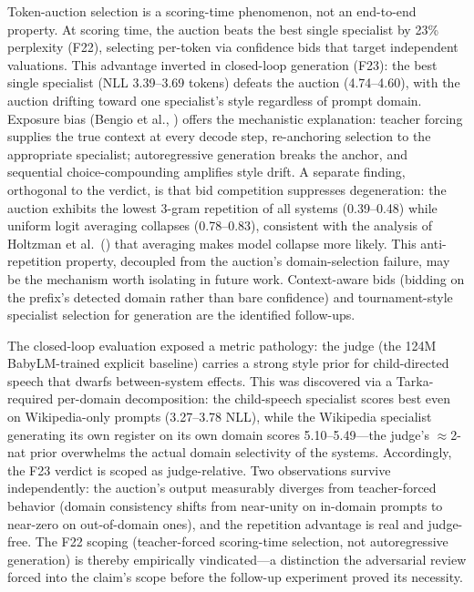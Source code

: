 Token-auction selection is a scoring-time phenomenon, not an end-to-end property. At scoring time, the auction beats the best single specialist by 23\% perplexity (F22), selecting per-token via confidence bids that target independent valuations. This advantage inverted in closed-loop generation (F23): the best single specialist (NLL 3.39--3.69 tokens) defeats the auction (4.74--4.60), with the auction drifting toward one specialist's style regardless of prompt domain. Exposure bias (Bengio et al., \cite{Bengio2015}) offers the mechanistic explanation: teacher forcing supplies the true context at every decode step, re-anchoring selection to the appropriate specialist; autoregressive generation breaks the anchor, and sequential choice-compounding amplifies style drift. A separate finding, orthogonal to the verdict, is that bid competition suppresses degeneration: the auction exhibits the lowest 3-gram repetition of all systems (0.39--0.48) while uniform logit averaging collapses (0.78--0.83), consistent with the analysis of Holtzman et al.\ (\cite{Holtzman2020}) that averaging makes model collapse more likely. This anti-repetition property, decoupled from the auction's domain-selection failure, may be the mechanism worth isolating in future work. Context-aware bids (bidding on the prefix's detected domain rather than bare confidence) and tournament-style specialist selection for generation are the identified follow-ups.

The closed-loop evaluation exposed a metric pathology: the judge (the 124M BabyLM-trained explicit baseline) carries a strong style prior for child-directed speech that dwarfs between-system effects. This was discovered via a Tarka-required per-domain decomposition: the child-speech specialist scores best even on Wikipedia-only prompts (3.27--3.78 NLL), while the Wikipedia specialist generating its own register on its own domain scores 5.10--5.49---the judge's $\approx$2-nat prior overwhelms the actual domain selectivity of the systems. Accordingly, the F23 verdict is scoped as judge-relative. Two observations survive independently: the auction's output measurably diverges from teacher-forced behavior (domain consistency shifts from near-unity on in-domain prompts to near-zero on out-of-domain ones), and the repetition advantage is real and judge-free. The F22 scoping (teacher-forced scoring-time selection, not autoregressive generation) is thereby empirically vindicated---a distinction the adversarial review forced into the claim's scope before the follow-up experiment proved its necessity.

